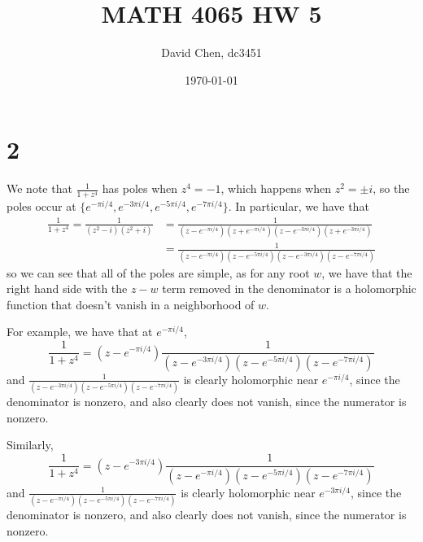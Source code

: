 \documentclass[12pt,letterpaper]{article}
\title{MATH 4065 HW 5}
\author{David Chen, dc3451}
\date{\today}
\theoremstyle{definition}
\newcommand{\incfig}[1]{}
\begin{document}
\maketitle

\section*{2}

\begin{figure}[H]
  \centering
  \incfig{problem2}
\end{figure}

We note that $\frac{1}{1+z^{4}}$ has poles when $z^{4} = -1$, which happens when $z^{2} = \pm i$, so the poles occur at $\{e^{-\pi i/4}, e^{-3\pi i/4},e^{-5\pi i/4},e^{-7\pi i/4}\}$. In particular, we have that
\begin{align*}
  \frac{1}{1+z^{4}} = \frac{1}{(z^{2} - i)(z^{2} + i)} &= \frac{1}{(z - e^{-\pi i/4})(z + e^{-\pi i/4})(z - e^{-3\pi i/4})(z + e^{-3\pi i/4})} \\
                                                       &= \frac{1}{(z - e^{-\pi i/4})(z - e^{-5\pi i/4})(z - e^{-3\pi i/4})(z - e^{-7\pi i/4})}
\end{align*}
so we can see that all of the poles are simple, as for any root $w$, we have that the right hand side with the $z - w$ term removed in the denominator is a holomorphic function that doesn't vanish in a neighborhood of $w$.

For example, we have that at $e^{-\pi i/4}$,
\[
  \frac{1}{1+z^{4}} = (z - e^{-\pi i/4})\frac{1}{(z-e^{-3\pi i/4})(z-e^{-5\pi i/4})(z-e^{-7\pi i/4})}
\]
and $\frac{1}{(z-e^{-3\pi i/4})(z-e^{-5\pi i/4})(z-e^{-7\pi i/4})}$ is clearly holomorphic near $e^{-\pi i/4}$, since the denominator is nonzero, and also clearly does not vanish, since the numerator is nonzero.

Similarly,
\[
  \frac{1}{1+z^{4}} = (z - e^{-3\pi i/4})\frac{1}{(z-e^{-\pi i/4})(z-e^{-5\pi i/4})(z-e^{-7\pi i/4})}
\]
and $\frac{1}{(z-e^{-\pi i/4})(z-e^{-5\pi i/4})(z-e^{-7\pi i/4})}$ is clearly holomorphic near $e^{-3\pi i/4}$, since the denominator is nonzero, and also clearly does not vanish, since the numerator is nonzero.
\end{document}
